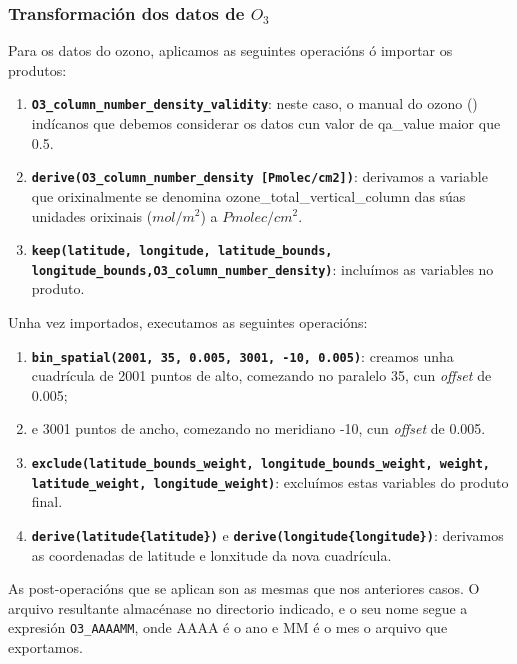 \subsubsection{Transformación dos datos de $O_3$}
Para os datos do ozono, aplicamos as seguintes operacións ó importar os produtos:
\begin{enumerate}
    \item \texttt{\textbf{O3\_column\_number\_density\_validity}}: neste caso, o manual do ozono (\cite{O3manual}) indícanos que debemos considerar os datos cun
    valor de qa\_value maior que 0.5.
    \item \texttt{\textbf{derive(O3\_column\_number\_density [Pmolec/cm2])}}: derivamos a variable que orixinalmente se denomina ozone\_total\_vertical\_column das súas
    unidades orixinais ($mol/m^2$) a $Pmolec/cm^2$.
    \item \texttt{\textbf{keep(latitude, longitude, latitude\_bounds, longitude\_bounds,\break O3\_column\_number\_density)}}: incluímos as variables no produto.
\end{enumerate}

Unha vez importados, executamos as seguintes operacións:
\begin{enumerate}
    \item \texttt{\textbf{bin\_spatial(2001, 35, 0.005, 3001, -10, 0.005)}}: creamos unha cuadrícula de 2001 puntos de alto, comezando no paralelo 35\textdegree, cun \textit{offset} de 0.005\textdegree;
    \item e 3001 puntos de ancho, comezando no meridiano -10\textdegree, cun \textit{offset} de 0.005.
    \item \texttt{\textbf{exclude(latitude\_bounds\_weight, longitude\_bounds\_weight, weight, latitude\_weight, longitude\_weight)}}: excluímos estas variables do produto final.
    \item \texttt{\textbf{derive(latitude\{latitude\})}} e  \texttt{\textbf{derive(longitude\{longitude\})}}: derivamos as coordenadas de latitude e lonxitude da nova cuadrícula.
\end{enumerate}

As post-operacións que se aplican son as mesmas que nos anteriores casos. O arquivo resultante almacénase no directorio indicado, e o seu nome segue a expresión \texttt{O3\_AAAAMM},
onde AAAA é o ano e MM é o mes o arquivo que exportamos.


